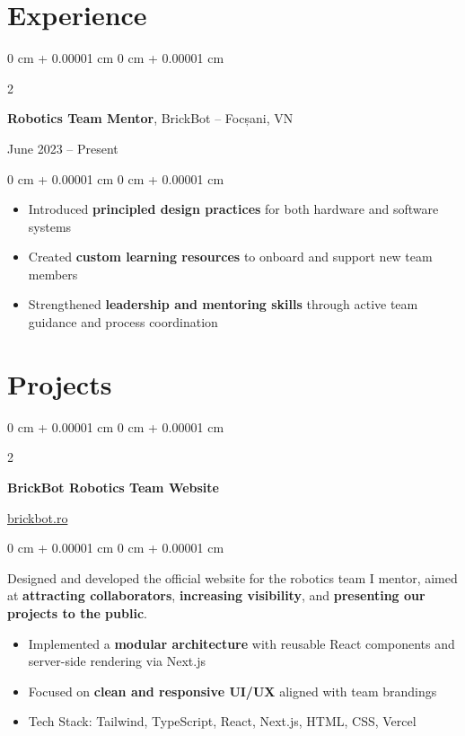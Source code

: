 \documentclass[10pt, letterpaper]{article}
\newenvironment{highlights}{
    \begin{itemize}[
        topsep=0.10 cm,
        parsep=0.10 cm,
        partopsep=0pt,
        itemsep=0pt,
        leftmargin=0 cm + 10pt
    ]
}{
    \end{itemize}
} %
\newenvironment{onecolentry}{
    \begin{adjustwidth}{
        0 cm + 0.00001 cm
    }{
        0 cm + 0.00001 cm
    }
}{
    \end{adjustwidth}
} %
\newenvironment{twocolentry}[2][]{
    \onecolentry
    \def\secondColumn{#2}
    \setcolumnwidth{\fill, 4.5 cm}
    \begin{paracol}{2}
}{
    \switchcolumn \raggedleft \secondColumn
    \end{paracol}
    \endonecolentry
} %
\begin{document}
    \section{Experience}
        
        \begin{twocolentry}{
    June 2023 – Present
}
    \textbf{Robotics Team Mentor}, BrickBot -- Focșani, VN
\end{twocolentry}

\vspace{0.10 cm}
\begin{onecolentry}
    \begin{highlights}
        \item Introduced \textbf{principled design practices} for both hardware and software systems
        \item Created \textbf{custom learning resources} to onboard and support new team members
        \item Strengthened \textbf{leadership and mentoring skills} through active team guidance and process coordination
    \end{highlights}
\end{onecolentry}


    
    \section{Projects}

        \begin{twocolentry}{
    \href{https://brickbot.ro}{brickbot.ro}
}
    \textbf{BrickBot Robotics Team Website}
\end{twocolentry}

\vspace{0.10 cm}
\begin{onecolentry}
    Designed and developed the official website for the robotics team I mentor, aimed at \textbf{attracting collaborators}, \textbf{increasing visibility}, and \textbf{presenting our projects to the public}.

    \begin{highlights}
        \item Implemented a \textbf{modular architecture} with reusable React components and server-side rendering via Next.js
        \item Focused on\textbf{ clean and responsive UI/UX} aligned with team brandings
        \item Tech Stack: Tailwind, TypeScript, React, Next.js, HTML, CSS, Vercel
    \end{highlights}
\end{onecolentry}
\end{document}
